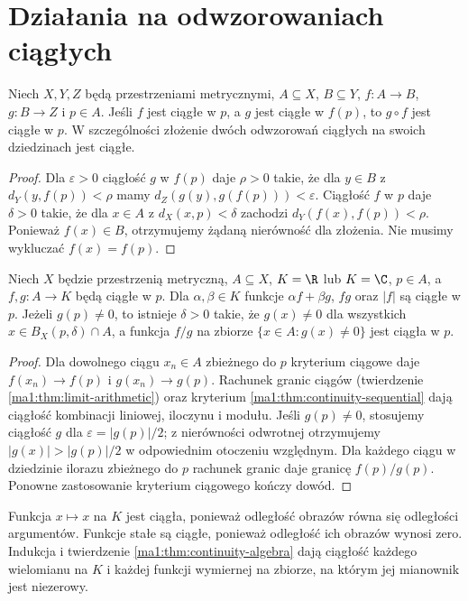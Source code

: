\section{Działania na odwzorowaniach ciągłych}
\begin{twierdzenie}
\label{ma1:thm:continuous-composition}
Niech $X,Y,Z$ będą przestrzeniami metrycznymi, $A\subseteq X$, $B\subseteq Y$, $f:A\to B$, $g:B\to Z$ i $p\in A$. Jeśli $f$ jest ciągłe w $p$, a $g$ jest ciągłe w $f(p)$, to $g\circ f$ jest ciągłe w $p$. W szczególności złożenie dwóch odwzorowań ciągłych na swoich dziedzinach jest ciągłe.
\end{twierdzenie}
\begin{proof}
Dla $\varepsilon>0$ ciągłość $g$ w $f(p)$ daje $\rho>0$ takie, że dla $y\in B$ z $d_Y(y,f(p))<\rho$ mamy $d_Z(g(y),g(f(p)))<\varepsilon$. Ciągłość $f$ w $p$ daje $\delta>0$ takie, że dla $x\in A$ z $d_X(x,p)<\delta$ zachodzi $d_Y(f(x),f(p))<\rho$. Ponieważ $f(x)\in B$, otrzymujemy żądaną nierówność dla złożenia. Nie musimy wykluczać $f(x)=f(p)$.
\end{proof}

\begin{twierdzenie}
\label{ma1:thm:continuity-algebra}
Niech $X$ będzie przestrzenią metryczną, $A\subseteq X$, $K=\R$ lub $K=\C$, $p\in A$, a $f,g:A\to K$ będą ciągłe w $p$. Dla $\alpha,\beta\in K$ funkcje $\alpha f+\beta g$, $fg$ oraz $|f|$ są ciągłe w $p$. Jeżeli $g(p)\ne0$, to istnieje $\delta>0$ takie, że $g(x)\ne0$ dla wszystkich $x\in B_X(p,\delta)\cap A$, a funkcja $f/g$ na zbiorze $\{x\in A:g(x)\ne0\}$ jest ciągła w $p$.
\end{twierdzenie}
\begin{proof}
Dla dowolnego ciągu $x_n\in A$ zbieżnego do $p$ kryterium ciągowe daje $f(x_n)\to f(p)$ i $g(x_n)\to g(p)$. Rachunek granic ciągów (twierdzenie \ref{ma1:thm:limit-arithmetic}) oraz kryterium \ref{ma1:thm:continuity-sequential} dają ciągłość kombinacji liniowej, iloczynu i modułu. Jeśli $g(p)\ne0$, stosujemy ciągłość $g$ dla $\varepsilon=|g(p)|/2$; z nierówności odwrotnej otrzymujemy $|g(x)|>|g(p)|/2$ w odpowiednim otoczeniu względnym. Dla każdego ciągu w dziedzinie ilorazu zbieżnego do $p$ rachunek granic daje granicę $f(p)/g(p)$. Ponowne zastosowanie kryterium ciągowego kończy dowód.
\end{proof}

\begin{przyklad}
\label{ma1:ex:continuous-polynomials}
Funkcja $x\mapsto x$ na $K$ jest ciągła, ponieważ odległość obrazów równa się odległości argumentów. Funkcje stałe są ciągłe, ponieważ odległość ich obrazów wynosi zero. Indukcja i twierdzenie \ref{ma1:thm:continuity-algebra} dają ciągłość każdego wielomianu na $K$ i każdej funkcji wymiernej na zbiorze, na którym jej mianownik jest niezerowy.
\end{przyklad}

